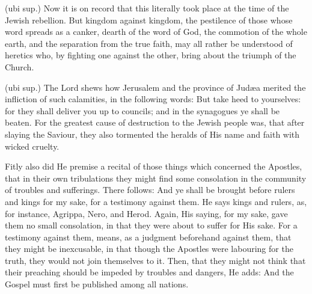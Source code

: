  (ubi sup.) Now it is on record that this literally took place at the time of the Jewish rebellion. But kingdom against kingdom, the pestilence of those whose word spreads as a canker, dearth of the word of God, the commotion of the whole earth, and the separation from the true faith, may all rather be understood of heretics who, by fighting one against the other, bring about the triumph of the Church.

 

 (ubi sup.) The Lord shews how Jerusalem and the province of Judæa merited the infliction of such calamities, in the following words: But take heed to yourselves: for they shall deliver you up to councils; and in the synagogues ye shall be beaten. For the greatest cause of destruction to the Jewish people was, that after slaying the Saviour, they also tormented the heralds of His name and faith with wicked cruelty.

 Fitly also did He premise a recital of those things which concerned the Apostles, that in their own tribulations they might find some consolation in the community of troubles and sufferings. There follows: And ye shall be brought before rulers and kings for my sake, for a testimony against them. He says kings and rulers, as, for instance, Agrippa, Nero, and Herod. Again, His saying, for my sake, gave them no small consolation, in that they were about to suffer for His sake. For a testimony against them, means, as a judgment beforehand against them, that they might be inexcusable, in that though the Apostles were labouring for the truth, they would not join themselves to it. Then, that they might not think that their preaching should be impeded by troubles and dangers, He adds: And the Gospel must first be published among all nations.

